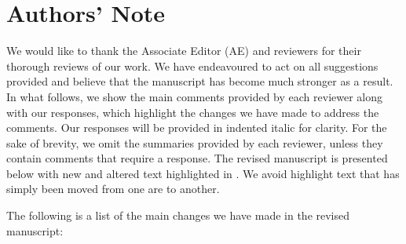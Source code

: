 \begingroup
\onecolumn
\setlength{\parindent}{0pt} 
\fontsize{12}{16}\selectfont
\titleformat{\section}{\LARGE\selectfont}{\thesection}{1em}{}
\titleformat{\subsection}{\Large\selectfont}{\thesubsection}{1em}{}
\titleformat{\subsubsection }{\large\selectfont\bfseries}{\thesubsection}{1em}{}
\section*{Authors' Note}

We would like to thank the Associate Editor (AE) and reviewers for their thorough reviews of our work. We have endeavoured to act on all suggestions provided and believe that the manuscript has become much stronger as a result. In what follows, we show the main comments provided by each reviewer along with our responses, which highlight the changes we have made to address the comments. Our responses will be provided in indented italic for clarity. For the sake of brevity, we omit the summaries provided by each reviewer, unless they contain comments that require a response. The revised manuscript is presented below with new and altered text highlighted in . We avoid highlight text that has simply been moved from one are to another.

The following is a list of the main changes we have made in the revised manuscript:

